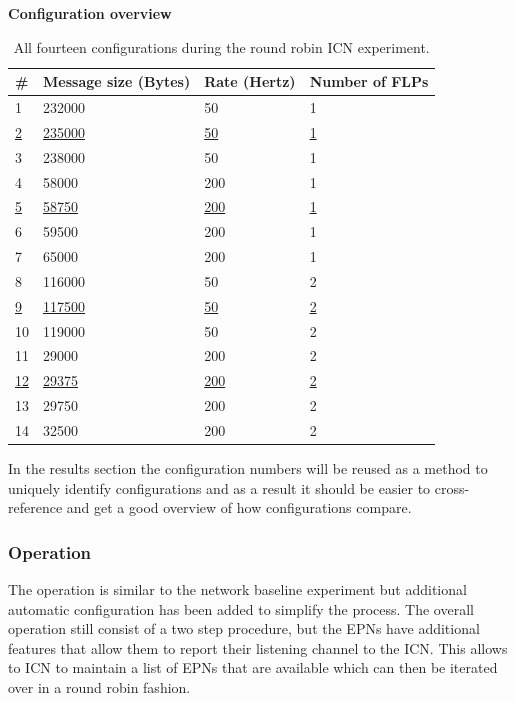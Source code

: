 \documentclass[]{article}
\begin{document}
\begin{table}[H]
	\textbf{Configuration overview}	
	\begin{center}
		\begin{tabular}{ | l | l | l | l | }
			\hline
			\textbf{\#} & \textbf{Message size (Bytes)} & \textbf{Rate (Hertz)} & \textbf{Number of FLPs} \\ \hline
			
			1 & 232000 & 50 & 1 \\ \hline
			\underline{2} & \underline{235000} & \underline{50} & \underline{1} \\ \hline
			3 & 238000 & 50 & 1 \\ \hline
			4 & 58000 & 200 & 1 \\ \hline
			\underline{5} & \underline{58750} & \underline{200} & \underline{1} \\ \hline
			6 & 59500 & 200 & 1 \\ \hline
			7 & 65000 & 200 & 1 \\ \hline
			8 & 116000 & 50 & 2 \\ \hline
			\underline{9} & \underline{117500} & \underline{50} & \underline{2} \\ \hline
			10 & 119000 & 50 & 2 \\ \hline
			11 & 29000 & 200 & 2 \\ \hline
			\underline{12} & \underline{29375} & \underline{200} & \underline{2} \\ \hline
			13 & 29750 & 200 & 2 \\ \hline
			14 & 32500 & 200 & 2 \\ \hline
		\end{tabular}
		\caption{All fourteen configurations during the round robin ICN experiment.}
		\label{tab:configoverviewround}
	\end{center}
\end{table}

In the results section the configuration numbers will be reused as a method to uniquely identify configurations and as a result it should be easier to cross-reference and get a good overview of how configurations compare.

\subsubsection{Operation}
The operation is similar to the network baseline experiment but additional automatic configuration has been added to simplify the process. The overall operation still consist of a two step procedure, but the EPNs have additional features that allow them to report their listening channel to the ICN. This allows to ICN to maintain a list of EPNs that are available which can then be iterated over in a round robin fashion.
\end{document}
